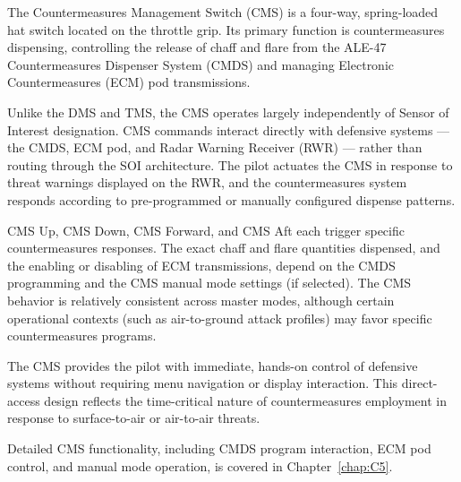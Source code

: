 \documentclass[11pt, a4paper, twoside]{report}
\begin{document}
The Countermeasures Management Switch (CMS) is a four-way, spring-loaded hat switch located on the throttle grip. Its primary function is countermeasures dispensing, controlling the release of chaff and flare from the ALE-47 Countermeasures Dispenser System (CMDS) and managing Electronic Countermeasures (ECM) pod transmissions.

Unlike the DMS and TMS, the CMS operates largely independently of Sensor of Interest designation. CMS commands interact directly with defensive systems — the CMDS, ECM pod, and Radar Warning Receiver (RWR) — rather than routing through the SOI architecture. The pilot actuates the CMS in response to threat warnings displayed on the RWR, and the countermeasures system responds according to pre-programmed or manually configured dispense patterns.

CMS Up, CMS Down, CMS Forward, and CMS Aft each trigger specific countermeasures responses. The exact chaff and flare quantities dispensed, and the enabling or disabling of ECM transmissions, depend on the CMDS programming and the CMS manual mode settings (if selected). The CMS behavior is relatively consistent across master modes, although certain operational contexts (such as air-to-ground attack profiles) may favor specific countermeasures programs.

The CMS provides the pilot with immediate, hands-on control of defensive systems without requiring menu navigation or display interaction. This direct-access design reflects the time-critical nature of countermeasures employment in response to surface-to-air or air-to-air threats.

Detailed CMS functionality, including CMDS program interaction, ECM pod control, and manual mode operation, is covered in Chapter~\ref{chap:C5}.

\end{document}
